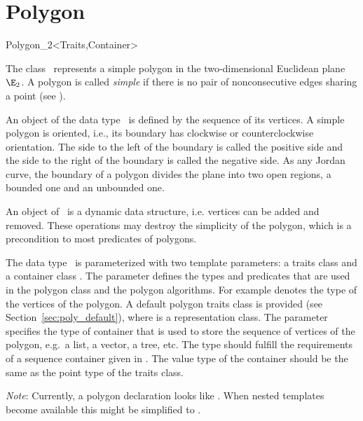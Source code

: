 
\cleardoublepage
\chapter{Polygon}\label{Polygon}

\begin{ccClassTemplate}{Polygon_2<Traits,Container>}

\ccDefinition

The class \ccClassName\ represents a simple polygon in the two-dimensional
Euclidean plane $\E_2$. A polygon is called {\em simple} if there is no pair
of nonconsecutive edges sharing a point (see \cite{ps-cgi-85}).

An object  of the data type \ccClassName\ is defined by the sequence
of its vertices. A simple polygon  is oriented, i.e., its boundary has
clockwise or counterclockwise orientation. The side to the left of the boundary
is called the positive side and the side to the right of the boundary is called
the negative side.  As any Jordan curve, the boundary of a polygon divides the
plane into two open regions, a bounded one and an unbounded one.

An object  of \ccClassName\ is a dynamic data
structure, i.e. vertices can be added and removed. These operations may
destroy the simplicity of the polygon, which is a precondition to most
predicates of polygons.

The data type \ccClassName\ is parameterized with two template parameters: 
a traits class  and a container class . 
The parameter  defines the types and predicates
that are used in the polygon class and the polygon algorithms.
For example  denotes the type of the vertices
of the polygon. 
A default polygon traits class  is provided 
(see Section~\ref{sec:poly_default}), where  is a representation 
class.
The parameter  specifies the type of container that is 
used to store the sequence of vertices of the polygon, e.g.\ a list, a vector, 
a tree, etc.
The type  should fulfill the requirements of a sequence 
container given in \cite{ms-strg-96}. 
The value type of the container should be the same as the point type of the 
traits class.

{\em Note}: Currently, a polygon declaration looks like
.
When nested templates become available this might be simplified to
.


\end{ccClassTemplate}

